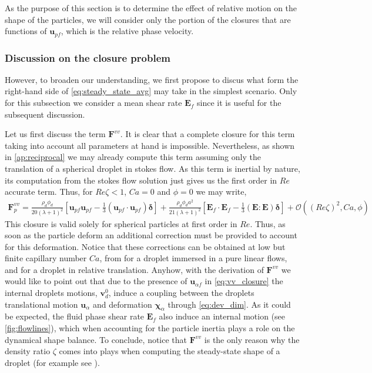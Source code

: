 As the purpose of this section is to determine the effect of relative motion on the shape of the particles, we will consider only the portion of the closures that are functions of $\textbf{u}_{pf}$, which is the relative phase velocity. 

\subsubsection{Discussion on the closure problem}   

However, to broaden our understanding, we first propose to discus what form the right-hand side of \ref{eq:steady_state_avg} may take in the simplest scenario. 
Only for this subsection we consider a mean shear rate $\textbf{E}_f$ since it is useful for the subsequent discussion. 

Let us first discuss the term $\textbf{F}^{vv}$. 
It is clear that a complete closure for this term taking into account all parameters at hand is impossible. 
Nevertheless, as shown in \ref{ap:reciprocal} we may already compute this term assuming only the translation of a spherical droplet in stokes flow. 
As this term is inertial by nature, its computation from the stokes flow solution just gives us the first order in $Re$ accurate term.
Thus, for $Re \zeta < 1$, $Ca = 0$ and $\phi = 0$ we may write,
\begin{align}
    \textbf{F}^{vv}_p
    = \frac{\rho_d \phi_d}{20(\lambda +1 )^2}
    \left[
        \textbf{u}_{p f}\textbf{u}_{p f} 
    -\frac{1}{3} (\textbf{u}_{p f}\cdot \textbf{u}_{p f})\bm\delta
    \right]
    + \frac{\rho_d \phi_d a^2}{21 (\lambda + 1)^2}[\textbf{E}_f\cdot \textbf{E}_f - \frac{1}{3}(\textbf{E}:\textbf{E})\bm\delta]
    + \mathcal{O}((Re\zeta)^2,Ca, \phi)
    \label{eq:vv_closure}
\end{align}
This closure is valid solely for spherical particles at first order in $Re$. 
Thus, as soon as the particle deform an additional correction must be provided to account for this deformation. 
Notice that these corrections can be obtained at low but finite capillary number $Ca$, from \citet{leal2007advanced} for a droplet immersed in a pure linear flows, and \citet{taylor1964deformation} for a droplet in relative translation. 
Anyhow, with the derivation of $\textbf{F}^{vv}$ we would like to point out that due to the presence of $\textbf{u}_{\alpha f}$ in \ref{eq:vv_closure} the internal droplets motions, $\textbf{v}_d^0$, induce a coupling between the droplets translational motion $\textbf{u}_\alpha$ and deformation $\bm\chi_\alpha$ through \ref{eq:dev_dim}. 
As it could be expected, the fluid phase shear rate $\textbf{E}_f$ also induce an internal motion (see \ref{fig:flowlines}), which when accounting for the particle inertia plays a role on the dynamical shape balance.  
To conclude, notice that $\textbf{F}^{vv}$ is the only reason why the density ratio $\zeta$ comes into plays when computing the steady-state shape of a droplet (for example see \citet{taylor1964deformation}). 

